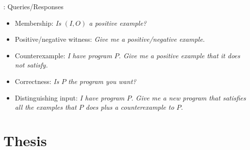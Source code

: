 \documentclass[notes=hide]{beamer}
\begin{document}
\begin{frame}{\secname}{\subsecname: Queries/Responses}
  \begin{itemize}[<+->]
  \item Membership: \textit{Is $(I,O)$ a positive example?}
  \item Positive/negative witness: \textit{Give me a positive/negative example.}
  \item Counterexample: \textit{I have program $P$. Give me a positive example
      that it does not satisfy.}
  \item Correctness: \textit{Is $P$ the program you want?}
  \item Distinguishing input: \textit{I have program $P$. Give me a new program
      that satisfies all the examples that $P$ does plus a counterexample to
      $P$.}
  \end{itemize}
\end{frame}

\section{Thesis}
\end{document}
